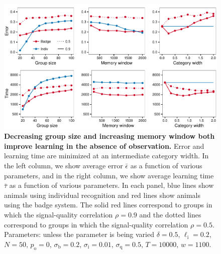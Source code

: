 \begin{figure}
\includegraphics[width=6.85in]{figures/parameters.pdf}
\caption{\sffamily\small\textbf{Decreasing group size and increasing memory window both improve learning in the absence of observation.} Error and learning time are minimized at an intermediate category width. In the left column, we show average error $\bar{\epsilon}$ as a function of various parameters, and in the right column, we show average learning time $\bar{\tau}$ as a function of various parameters. In each panel, blue lines show animals using individual recognition and red lines show animals using the badge system. The solid red lines correspond to groups in which the signal-quality correlation $\rho=0.9$ and the dotted lines correspond to groups in which the signal-quality correlation $\rho=0.5$. Parameters: unless the parameter is being varied $\delta = 0.5$, $\ell_\text{i}=0.2$, $N=50$, $p_\text{o}=0$, $\sigma_\text{b}=0.2$, $\sigma_\text{i}=0.01$, $\sigma_\text{q}=0.5$, $T=10000$, $w=1100$.}
\label{parameters}
\end{figure}

